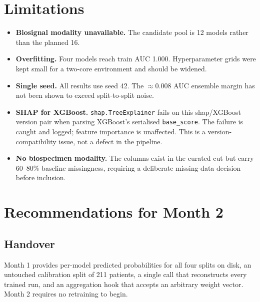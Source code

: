 \documentclass[11pt,a4paper]{article}
\newcommand{\code}[1]{\texttt{\small #1}}
\begin{document}
\section{Limitations}
\label{sec:limitations}

\begin{itemize}
  \item \textbf{Biosignal modality unavailable.} The candidate pool is 12
        models rather than the planned 16.
  \item \textbf{Overfitting.} Four models reach train AUC 1.000. Hyperparameter
        grids were kept small for a two-core environment and should be widened.
  \item \textbf{Single seed.} All results use seed 42. The $\approx 0.008$ AUC
        ensemble margin has not been shown to exceed split-to-split noise.
  \item \textbf{SHAP for XGBoost.} \code{shap.TreeExplainer} fails on this
        shap/XGBoost version pair when parsing XGBoost's serialised
        \code{base\_score}. The failure is caught and logged; feature importance
        is unaffected. This is a version-compatibility issue, not a defect in
        the pipeline.
  \item \textbf{No biospecimen modality.} The columns exist in the curated cut
        but carry 60--80\% baseline missingness, requiring a deliberate
        missing-data decision before inclusion.
\end{itemize}

\section{Recommendations for Month 2}

\subsection{Handover}

Month 1 provides per-model predicted probabilities for all four splits on disk,
an untouched calibration split of 211 patients, a single call that reconstructs
every trained run, and an aggregation hook that accepts an arbitrary weight
vector. Month 2 requires no retraining to begin.
\end{document}
